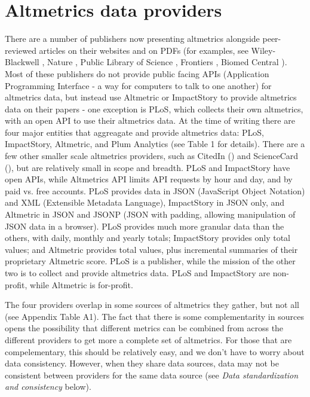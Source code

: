 \documentclass[letterpaper,superscriptaddress,showkeys,longbibliography]{revtex4-1}\usepackage{graphicx, color}
\newcommand{\ignore}[1]{}
\begin{document}
\section*{Altmetrics data providers}

There are a number of publishers now presenting altmetrics alongside peer-reviewed articles on their websites and on PDFs (for examples, see Wiley-Blackwell \cite{wiley}, Nature \cite{nature}, Public Library of Science \cite{plos}, Frontiers \cite{frontiers}, Biomed Central \cite{bmcentral}). Most of these publishers do not provide public facing APIs (Application Programming Interface - a way for computers to talk to one another) for altmetrics data, but instead use Altmetric or ImpactStory to provide altmetrics data on their papers - one exception is PLoS, which collects their own altmetrics, with an open API to use their altmetrics data. At the time of writing there are four major entities that aggreagate and provide altmetrics data: PLoS, ImpactStory, Altmetric, and Plum Analytics (see Table 1 for details). \ignore{Plum Analytics does not have an open public facing interface or API, so will not be discussed further.} There are a few other smaller scale altmetrics providers, such as CitedIn (\cite{citedin}) and ScienceCard (\cite{sciencecard}), but are relatively small in scope and breadth. PLoS and ImpactStory have open APIs, while Altmetrics API limits API requests by hour and day, and by paid vs. free accounts. PLoS provides data in JSON (JavaScript Object Notation) and XML (Extensible Metadata Language), ImpactStory in JSON only, and Altmetric in JSON and JSONP (JSON with padding, allowing manipulation of JSON data in a browser). PLoS provides much more granular data than the others, with daily, monthly and yearly totals; ImpactStory provides only total values; and Altmetric provides total values, plus incremental summaries of their proprietary Altmetric score. PLoS is a publisher, while the mission of the other two is to collect and provide altmetrics data. PLoS and ImpactStory are non-profit, while Altmetric is for-profit.

The four providers overlap in some sources of altmetrics they gather, but not all (see Appendix Table A1). The fact that there is some complementarity in sources opens the possibility that different metrics can be combined from across the different providers to get more a complete set of altmetrics. For those that are compelementary, this should be relatively easy, and we don't have to worry about data consistency. However, when they share data sources, data may not be consistent between providers for the same data source (see \emph{Data standardization and consistency} below).
\end{document}
